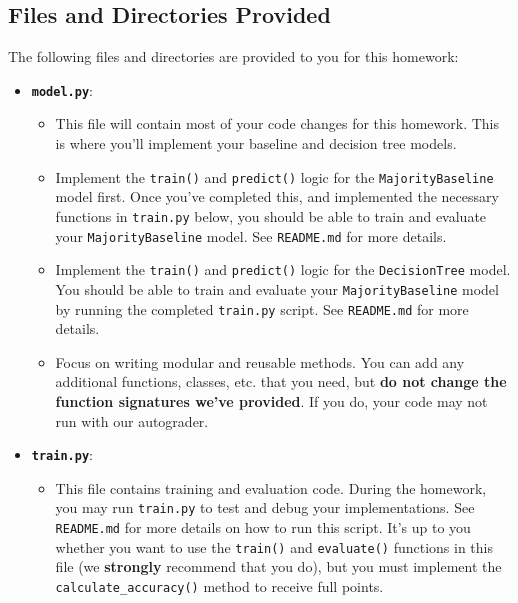 \subsection*{Files and Directories Provided}

The following files and directories are provided to you for this homework:

\begin{itemize}\itemsep0em
    \item \textbf{\texttt{model.py}}:
    \begin{itemize}\itemsep0em
        \item This file will contain most of your code changes for this homework. 
        This is where you'll implement your baseline and decision tree models.
        \item Implement the \texttt{train()} and \texttt{predict()} logic for the \texttt{MajorityBaseline} model first. 
        Once you've completed this, and implemented the necessary functions in \texttt{train.py} below, you should be able to train and evaluate your \texttt{MajorityBaseline} model. 
        See \texttt{README.md} for more details.
        \item Implement the \texttt{train()} and \texttt{predict()} logic for the \texttt{DecisionTree} model. 
        You should be able to train and evaluate your \texttt{MajorityBaseline} model by running the completed \texttt{train.py} script. 
        See \texttt{README.md} for more details.
        \item Focus on writing modular and reusable methods. 
        You can add any additional functions, classes, etc. that you need, but \textbf{do not change the function signatures we've provided}. 
        If you do, your code may not run with our autograder.
    \end{itemize}

    \item \textbf{\texttt{train.py}}:
    \begin{itemize}\itemsep0em
        \item This file contains training and evaluation code. 
        During the homework, you may run \texttt{train.py} to test and debug your implementations. 
        See \texttt{README.md} for more details on how to run this script. 
        It's up to you whether you want to use the \texttt{train()} and \texttt{evaluate()} functions in this file (we \textbf{strongly} recommend that you do), but you must implement the \texttt{calculate\_accuracy()} method to receive full points.
    \end{itemize}
    

\end{itemize}

